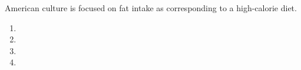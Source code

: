 American culture is focused on fat intake as corresponding to a high-calorie diet.
\begin{enumerate}[label=(\alph*)]
    \item 
    \item  \vspace{1in}
    \item 
    \item 
\end{enumerate}